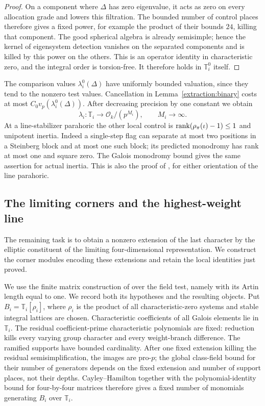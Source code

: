 \begin{proof}
On a component where $\Delta$ has zero eigenvalue, it acts
as zero on every allocation grade and lowers this filtration.
The bounded number of control places therefore gives a fixed
power, for example the product of their bounds $24$, killing
that component.  The good spherical algebra is already
semisimple; hence the kernel of eigensystem detection vanishes
on the separated components and is killed by this power on
the others.  This is an operator identity in characteristic
zero, and the integral order is torsion-free.  It therefore
holds in $\mathbb T_i^0$ itself.
\end{proof}

The comparison values $\lambda_i^0(\Delta)$ have uniformly
bounded valuation, since they tend to the nonzero test values.
Cancellation in Lemma~\ref{extraction:binary} costs at most
$C_0v_p(\lambda_i^0(\Delta))$.  After decreasing precision by
one constant we obtain
\begin{equation}
 \lambda_i:\mathbb T_i\longrightarrow\mathcal O_k/(p^{M_i}),
                      \qquad M_i\longrightarrow\infty.
\label{extraction:reduced-orders}
\end{equation}
At a line-stabilizer parahoric the other local control is
$\operatorname{rank}(\rho_\pi(\iota)-1)\leq1$ and unipotent inertia.
Indeed a single-step flag can separate at most two positions
in a Steinberg block and at most one such block; its predicted
monodromy has rank at most one and square zero.  The Galois
monodromy bound gives the same assertion for actual inertia.
This is also the proof of \cite[Lemma~8.8]{C}, for either orientation
of the line parahoric.

\subsection{The limiting corners and the highest-weight line}

The remaining task is to obtain a nonzero extension of the last
character by the elliptic constituent of the limiting
four-dimensional representation.  We construct the corner
modules encoding these extensions and retain the local identities
just proved.

We use the finite matrix construction of \cite[Section~9,
Lemmas~9.1--9.3]{C} over the field test, namely with
its Artin length equal to one.  We record both its hypotheses
and the resulting objects.  Put $B_i=\mathbb T_i[\rho_i]$, where
$\rho_i$ is the product of all characteristic-zero systems and
stable integral lattices are chosen.  Characteristic coefficients
of all Galois elements lie in $\mathbb T_i$.  The residual
coefficient-prime characteristic polynomials are fixed: reduction
kills every varying group character and every weight-branch
difference.  The ramified supports have bounded cardinality.
After one fixed extension killing the residual semisimplification,
the images are pro-$p$; the global class-field bound for their
number of generators depends on the fixed extension and number
of support places, not their depths.  Cayley--Hamilton together
with the polynomial-identity bound for four-by-four matrices
therefore gives a fixed number of monomials generating $B_i$
over $\mathbb T_i$.

